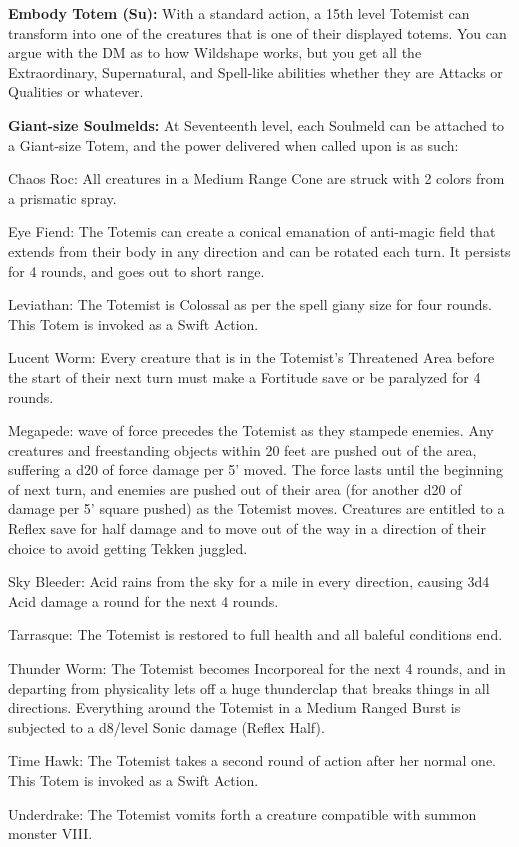 \textbf{Embody Totem (Su):} With a standard action, a 15th level Totemist can transform into one of the creatures that is one of their displayed totems. You can argue with the DM as to how Wildshape works, but you get all the Extraordinary, Supernatural, and Spell-like abilities whether they are Attacks or Qualities or whatever. 

\textbf{Giant-size Soulmelds:} At Seventeenth level, each Soulmeld can be attached to a Giant-size Totem, and the power delivered when called upon is as such: 
\begin{itemize*}
\item Chaos Roc: All creatures in a Medium Range Cone are struck with 2 colors from a prismatic spray. 
\item Eye Fiend: The Totemis can create a conical emanation of anti-magic field that extends from their body in any direction and can be rotated each turn. It persists for 4 rounds, and goes out to short range. 
\item Leviathan: The Totemist is Colossal as per the spell giany size for four rounds. This Totem is invoked as a Swift Action. 
\item Lucent Worm: Every creature that is in the Totemist's Threatened Area before the start of their next turn must make a Fortitude save or be paralyzed for 4 rounds.
\item Megapede: wave of force precedes the Totemist as they stampede enemies. Any creatures and freestanding objects within 20 feet are pushed out of the area, suffering a d20 of force damage per 5' moved. The force lasts until the beginning of next turn, and enemies are pushed out of their area (for another d20 of damage per 5' square pushed) as the Totemist moves. Creatures are entitled to a Reflex save for half damage and to move out of the way in a direction of their choice to avoid getting Tekken juggled. 
\item Sky Bleeder: Acid rains from the sky for a mile in every direction, causing 3d4 Acid damage a round for the next 4 rounds. 
\item Tarrasque: The Totemist is restored to full health and all baleful conditions end. 
\item Thunder Worm: The Totemist becomes Incorporeal for the next 4 rounds, and in departing from physicality lets off a huge thunderclap that breaks things in all directions. Everything around the Totemist in a Medium Ranged Burst is subjected to a d8/level Sonic damage (Reflex Half). 
\item Time Hawk: The Totemist takes a second round of action after her normal one. This Totem is invoked as a Swift Action. 
\item Underdrake: The Totemist vomits forth a creature compatible with summon monster VIII. 
\end{itemize*}

